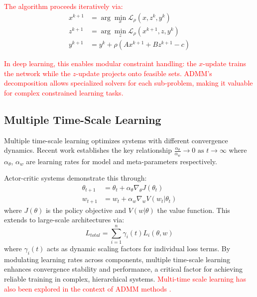\documentclass[preprint,12pt,authoryear]{elsarticle}
\begin{document}
\textcolor{red}{The algorithm proceeds iteratively via:}
\begin{align}
x^{k+1} &= \arg\min_{x} \mathcal{L}_\rho(x, z^k, y^k) \\
z^{k+1} &= \arg\min_{z} \mathcal{L}_\rho(x^{k+1}, z, y^k) \\
y^{k+1} &= y^k + \rho (Ax^{k+1} + Bz^{k+1} - c)
\end{align}

\textcolor{red}{In deep learning, this enables modular constraint handling: the $x$-update trains the network while the $z$-update projects onto feasible sets. ADMM's decomposition allows specialized solvers for each sub-problem, making it valuable for complex constrained learning tasks.}

\subsection{Multiple Time-Scale Learning}
Multiple time-scale learning optimizes systems with different convergence dynamics. Recent work \cite{Marion2023Leveraging} establishes the key relationship $\frac{\alpha_\theta}{\alpha_w} \rightarrow 0 \text{ as } t \rightarrow \infty$ where $\alpha_\theta$, $\alpha_w$ are learning rates for model and meta-parameters respectively.

Actor-critic systems demonstrate this through:
\begin{equation}
\begin{aligned}
\theta_{t+1} &= \theta_t + \alpha_\theta \nabla_\theta J(\theta_t) \\
w_{t+1} &= w_t + \alpha_w \nabla_w V(w_t|\theta_t)
\end{aligned}
\end{equation}
where $J(\theta)$ is the policy objective and $V(w|\theta)$ the value function. This extends to large-scale architectures \cite{wu2020understanding} via:
\begin{equation}
L_{total} = \sum_{i=1}^n \gamma_i(t) L_i(\theta, w)
\end{equation}
where $\gamma_i(t)$ acts as dynamic scaling factors for individual loss terms. By modulating learning rates across components, multiple time-scale learning enhances convergence stability and performance, a critical factor for achieving reliable training in complex, hierarchical systems. \textcolor{red}{Multi-time scale learning has also been explored in the context of ADMM methods \cite{zeng2021admm_constrained_problems_convergence_saturation, chen2017note_admm_constrained_problems}.}
\end{document}
